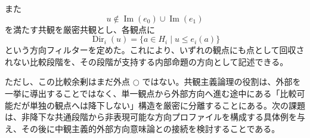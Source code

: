 \documentclass[a4paper,11pt]{ltjsarticle}
\theoremstyle{definition}
\theoremstyle{plain}
\newcommand{\Img}{\operatorname{Im}}
\newcommand{\Dir}{\operatorname{Dir}}
\newcommand{\dfix}{\bigcirc}
\begin{document}
また
\[
 u\notin\Img(e_0)\cup\Img(e_1)
\]
を満たす共観を厳密共観とし、各観点に
\[
 \Dir_i(u)=\{a\in H_i\mid u\leq e_i(a)\}
\]
という方向フィルターを定めた。これにより、いずれの観点にも点として回収されない比較段階を、その段階が支持する内部命題の方向として記述できる。

ただし、この比較余剰はまだ外点 $\dfix$ ではない。共観主義論理の役割は、外部を一挙に導出することではなく、単一観点から外部方向へ進む途中にある「比較可能だが単独の観点へは降下しない」構造を厳密に分離することにある。次の課題は、非降下な共通段階から非表現可能な方向プロファイルを構成する具体例を与え、その後に中観主義的外部方向意味論との接続を検討することである。



\end{document}

